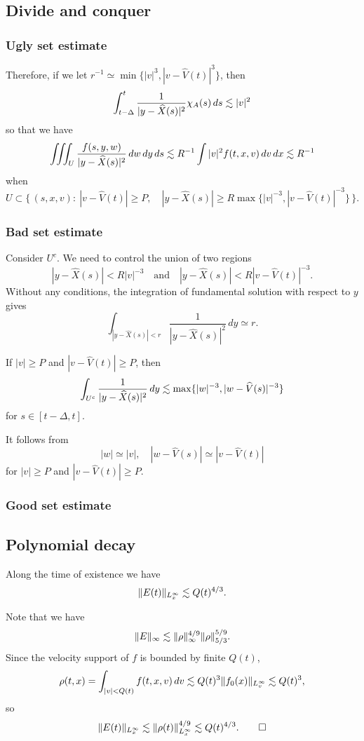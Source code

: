 \documentclass[11pt]{amsart}
\begin{document}
\subsection{Divide and conquer}
\subsubsection{Ugly set estimate}

Therefore, if we let $r^{-1}\simeq\min\{|v|^3,|v-\hat V(t)|^3\}$, then
\[\int_{t-\Delta}^t\frac1{|y-\widehat X(s)|^2}\chi_A(s)\,ds\lesssim|v|^2\]
so that we have
\[\iiint_U\frac{f(s,y,w)}{|y-\widehat X(s)|^2}\,dw\,dy\,ds\lesssim R^{-1}\int|v|^2f(t,x,v)\,dv\,dx\lesssim R^{-1}\]
when
\[U\subset\{\,(s,x,v):\ |v-\hat V(t)|\ge P,\quad|y-\hat X(s)|\ge R\max\{|v|^{-3},|v-\hat V(t)|^{-3}\}\,\}.\]

\subsubsection{Bad set estimate}
Consider $U^c$.
We need to control the union of two regions
\[|y-\hat X(s)|<R|v|^{-3}\quad\text{and}\quad|y-\hat X(s)|<R|v-\hat V(t)|^{-3}.\]
Without any conditions, the integration of fundamental solution with respect to $y$ gives
\[\int_{|y-\hat X(s)|<r}\frac1{|y-\hat X(s)|^2}\,dy\simeq r.\]
\begin{clm}
If $|v|\ge P$ and $|v-\hat V(t)|\ge P$, then
\[\int_{U^c}\frac1{|y-\widehat X(s)|^2}\,dy\lesssim\max\{|w|^{-3},|w-\widehat V(s)|^{-3}\}\]
for $s\in[t-\Delta,t]$.
\end{clm}
\begin{pf}
It follows from
\[|w|\simeq|v|,\quad|w-\hat V(s)|\simeq|v-\hat V(t)|\]
for $|v|\ge P$ and $|v-\hat V(t)|\ge P$.
\end{pf}

\subsubsection{Good set estimate}

\subsection{Polynomial decay}
\begin{lem}
Along the time of existence we have
\[\|E(t)\|_{L_x^\infty}\lesssim Q(t)^{4/3}.\]
\end{lem}
\begin{pf}
Note that we have
\[\|E\|_\infty\lesssim\|\rho\|_\infty^{4/9}\|\rho\|_{5/3}^{5/9}.\]
Since the velocity support of $f$ is bounded by finite $Q(t)$,
\[\rho(t,x)=\int_{|v|<Q(t)}f(t,x,v)\,dv\lesssim Q(t)^3\|f_0(x)\|_{L_v^\infty}\lesssim Q(t)^3,\]
so
\[\|E(t)\|_{L_x^\infty}\lesssim\|\rho(t)\|_{L_x^\infty}^{4/9}\lesssim Q(t)^{4/3}.\qedhere\]
\end{pf}
\end{document}
